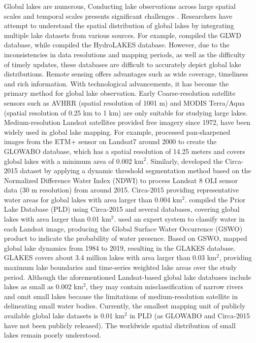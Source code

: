 \documentclass[preprint,12pt,authoryear]{elsarticle}
\begin{document}
Global lakes are numerous, Conducting lake observations across large spatial scales and temporal scales presents significant challenges \citep{sheng_representative_2016}. Researchers have  attempt to understand the spatial distribution of global lakes by integrating multiple lake datasets from various sources. For example, \citet{lehner_development_2004} compiled the GLWD database, while \citet{messager_estimating_2016} compiled the HydroLAKES database. However, due to the inconsistencies in data resolutions and mapping periods, as well as the difficulty of timely updates, these databases are difficult to accurately depict global lake distributions. Remote sensing offers advantages such as wide coverage, timeliness and rich information. With technological advancements, it has become the primary method for global lake observation. Early Coarse-resolution satellite sensors such as AVHRR (spatial resolution of 1001 m) and MODIS Terra/Aqua (spatial resolution of 0.25 km to 1 km) are only suitable for studying large lakes. Medium-resolution Landsat satellites provided free imagery since 1972, have been widely used in global lake mapping. For example, \citet{verpoorter_global_2014} processed pan-sharpened images from the ETM+ sensor on Landsat7 around 2000 to create the GLOWABO database, which has a spatial resolution of 14.25 meters and covers global lakes with a minimum area of 0.002 km$^2$. Similarly, \citet{sheng_representative_2016} developed the Circa-2015 dataset by applying a dynamic threshold segmentation method based on the Normalized Difference Water Index (NDWI) \citep{mcfeeters_use_1996} to process Landsat 8 OLI sensor data (30 m resolution) from around 2015. Circa-2015 providing representative water areas for global lakes with area larger than 0.004 km$^2$. \citet{wang_surface_2025} compiled the Prior Lake Database (PLD) using Circa-2015 and several databases, covering global lakes with area larger than 0.01 km$^2$. \citet{pekel_high-resolution_2016} used an expert system to classify water in each Landsat image, producing the Global Surface Water Occurrence (GSWO) product to indicate the probability of water presence. Based on GSWO, \citet{pi_mapping_2022} mapped global lake dynamics from 1984 to 2019, resulting in the GLAKES database. GLAKES covers about 3.4 million lakes with area larger than 0.03 km$^2$, providing maximum lake boundaries and time-series weighted lake areas over the study period. Although the aforementioned Landsat-based global lake databases include lakes as small as 0.002 km$^2$, they may contain misclassification of narrow rivers and omit small lakes because the limitations of medium-resolution satellite in delineating small water bodies. Currently, the smallest mapping unit of publicly available global lake datasets is 0.01 km$^2$ in PLD (as GLOWABO and Circa-2015 have not been publicly released). The worldwide spatial distribution of small lakes remain poorly understood.
\end{document}
